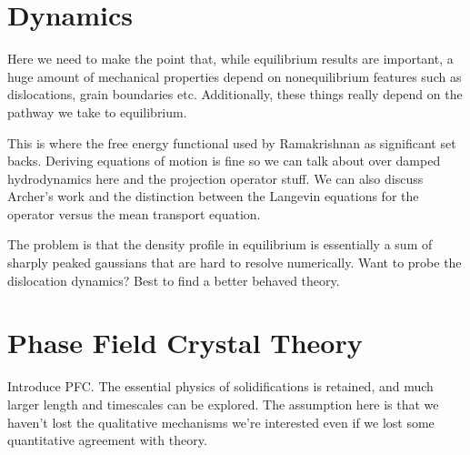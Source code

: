 \section{Dynamics} %

{\color{ForestGreen} { \bfseries
    
    
    Here we need to make the point that, while equilibrium results are
    important, a huge amount of mechanical properties depend on nonequilibrium
    features such as dislocations, grain boundaries etc. Additionally, these
    things really depend on the pathway we take to equilibrium. 

    This is where the free energy functional used by Ramakrishnan as
    significant set backs. Deriving equations of motion is fine so we can talk
    about over damped hydrodynamics here and the projection operator stuff. We
    can also discuss Archer's work and the distinction between the Langevin
    equations for the operator versus the mean transport equation.

    The problem is that the density profile in equilibrium is essentially a sum
    of sharply peaked gaussians that are hard to resolve numerically. Want to
    probe the dislocation dynamics? Best to find a better behaved theory.}
}

\section{Phase Field Crystal Theory} %

{\color{ForestGreen} {\bfseries


    Introduce PFC. The essential physics of solidifications is retained, and
    much larger length and timescales can be explored. The assumption here is
    that we haven't lost the qualitative mechanisms we're interested even if we
    lost some quantitative agreement with theory.}
}
